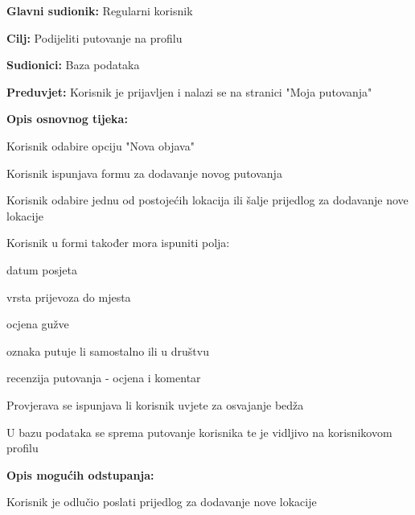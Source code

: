 					
					\noindent {}
					\begin{packed_item}
	
						\item \textbf{Glavni sudionik: }Regularni korisnik
						\item  \textbf{Cilj:} Podijeliti putovanje na profilu
						\item  \textbf{Sudionici:} Baza podataka
						\item  \textbf{Preduvjet:} Korisnik je prijavljen i nalazi se na stranici "Moja putovanja"
						\item  \textbf{Opis osnovnog tijeka:}
						
						\item[] \begin{packed_enum}
	                        \item Korisnik odabire opciju "Nova objava"
							\item Korisnik ispunjava formu za dodavanje novog putovanja
							\item Korisnik odabire jednu od postojećih lokacija ili šalje prijedlog za dodavanje nove lokacije 
							\item Korisnik u formi također mora ispuniti polja:
							\begin{packed_item}
							    \item datum posjeta
							    \item vrsta prijevoza do mjesta
							    \item ocjena gužve
							    \item oznaka putuje li samostalno ili u društvu
							    \item recenzija putovanja - ocjena i komentar
							\end{packed_item}
							\item Provjerava se ispunjava li korisnik uvjete za osvajanje bedža
							\item U bazu podataka se sprema putovanje korisnika te je vidljivo na korisnikovom profilu
		

						\end{packed_enum}
						
						\item  \textbf{Opis mogućih odstupanja:}
						
						\item[] \begin{packed_item}
	
							\item[13.a] Korisnik je odlučio poslati prijedlog za dodavanje nove lokacije
							\item[] \begin{packed_enum}
								

\end{packed_enum}
\end{packed_item}
\end{packed_item}

